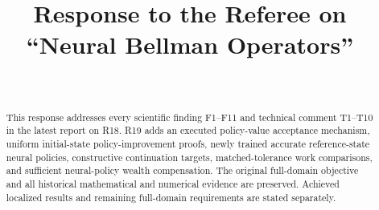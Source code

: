 \documentclass[ecta]{econsocart}
\theoremstyle{remark}
\begin{document}
\begin{frontmatter}
\title{Response to the Referee on ``Neural Bellman Operators''}
\begin{aug}
\author[id=au1,addressref={add1}]{~}
\address[id=add1]{}
\end{aug}
\begin{abstract}
This response addresses every scientific finding F1--F11 and technical comment T1--T10 in the latest report on R18. R19 adds an executed policy-value acceptance mechanism, uniform initial-state policy-improvement proofs, newly trained accurate reference-state neural policies, constructive continuation targets, matched-tolerance work comparisons, and sufficient neural-policy wealth compensation. The original full-domain objective and all historical mathematical and numerical evidence are preserved. Achieved localized results and remaining full-domain requirements are stated separately.
\end{abstract}
\end{frontmatter}

\end{document}
